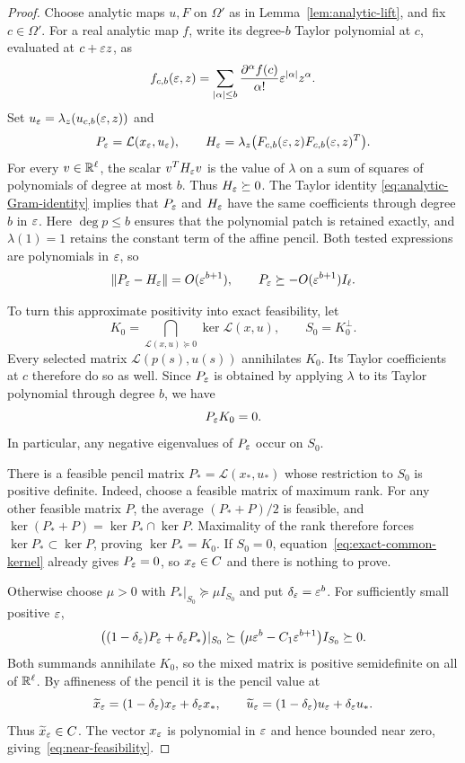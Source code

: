 \begin{proof}
Choose analytic maps $u,F$ on $\Omega'$ as in
Lemma~\ref{lem:analytic-lift}, and fix $c\in\Omega'$.  For a real analytic
map $f$, write its degree-$b$ Taylor polynomial at $c$, evaluated at
$c+\varepsilon z$, as
\[
 f_{c,b}(\varepsilon,z)=\sum_{|\alpha|\le b}
  \frac{\partial^\alpha f(c)}{\alpha!}\varepsilon^{|\alpha|}z^\alpha.
\]
Set $u_\varepsilon=\lambda_z(u_{c,b}(\varepsilon,z))$ and
\[
 P_\varepsilon=\mathcal L(x_\varepsilon,u_\varepsilon),\qquad
 H_\varepsilon=\lambda_z\bigl(F_{c,b}(\varepsilon,z)F_{c,b}(\varepsilon,z)^T\bigr).
\]
For every $v\in\mathbb R^\ell$, the scalar $v^TH_\varepsilon v$ is the value of
$\lambda$ on a sum of squares of polynomials of degree at most $b$.
Thus $H_\varepsilon\succeq0$.  The Taylor identity
\eqref{eq:analytic-Gram-identity} implies that $P_\varepsilon$ and $H_\varepsilon$
have the same coefficients through degree $b$ in $\varepsilon$.  Here
$\deg p\le b$ ensures that the polynomial patch is retained exactly,
and $\lambda(1)=1$ retains the constant term of the affine pencil.
Both tested expressions are polynomials in $\varepsilon$, so
\begin{equation}
 \label{eq:approximate-pencil}
 \|P_\varepsilon-H_\varepsilon\|=O(\varepsilon^{b+1}),\qquad
 P_\varepsilon\succeq-O(\varepsilon^{b+1})I_\ell.
\end{equation}

To turn this approximate positivity into exact feasibility, let
\[
 K_0=\bigcap_{\mathcal L(x,u)\succeq0}\ker\mathcal L(x,u),
 \qquad S_0=K_0^\perp.
\]
Every selected matrix $\mathcal L(p(s),u(s))$ annihilates $K_0$.
Its Taylor coefficients at $c$ therefore do so as well.  Since
$P_\varepsilon$ is obtained by applying $\lambda$ to its Taylor polynomial
through degree $b$, we have
\begin{equation}
 \label{eq:exact-common-kernel}
 P_\varepsilon K_0=0.
\end{equation}
In particular, any negative eigenvalues of $P_\varepsilon$ occur on $S_0$.

There is a feasible pencil matrix $P_*=\mathcal L(x_*,u_*)$ whose
restriction to $S_0$ is positive definite.  Indeed, choose a feasible
matrix of maximum rank.  For any other feasible matrix $P$, the average
$(P_*+P)/2$ is feasible, and
$\ker(P_*+P)=\ker P_*\cap\ker P$.  Maximality of the rank therefore
forces $\ker P_*\subset\ker P$, proving $\ker P_*=K_0$.
If $S_0=0$, equation~\eqref{eq:exact-common-kernel} already gives
$P_\varepsilon=0$, so $x_\varepsilon\in C$ and there is nothing to prove.

Otherwise choose $\mu>0$ with $P_*|_{S_0}\succeq\mu I_{S_0}$ and put
$\delta_\varepsilon=\varepsilon^b$.  For sufficiently small positive $\varepsilon$,
\[
 \bigl((1-\delta_\varepsilon)P_\varepsilon+\delta_\varepsilon P_*\bigr)|_{S_0}
 \succeq\bigl(\mu\varepsilon^b-C_1\varepsilon^{b+1}\bigr)I_{S_0}
 \succeq0.
\]
Both summands annihilate $K_0$, so the mixed matrix is positive
semidefinite on all of $\mathbb R^\ell$.  By affineness of the pencil it is the
pencil value at
\[
 \widetilde x_\varepsilon=(1-\delta_\varepsilon)x_\varepsilon+\delta_\varepsilon x_*,\qquad
 \widetilde u_\varepsilon=(1-\delta_\varepsilon)u_\varepsilon+\delta_\varepsilon u_*.
\]
Thus $\widetilde x_\varepsilon\in C$.  The vector $x_\varepsilon$ is polynomial in
$\varepsilon$ and hence bounded near zero, giving~\eqref{eq:near-feasibility}.
\end{proof}

